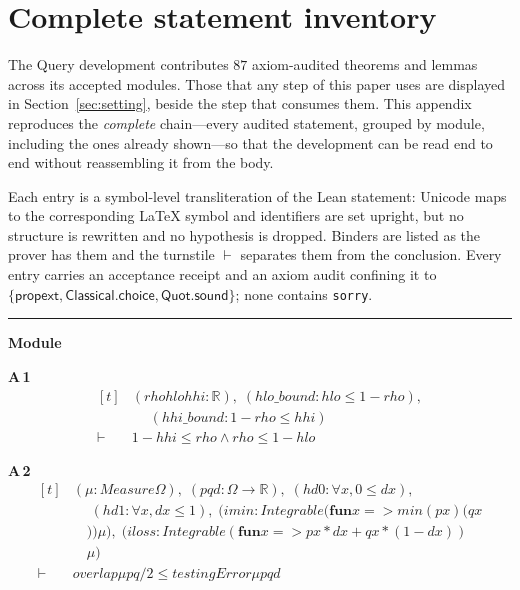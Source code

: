 \appendices
\section{Complete statement inventory}
\label{app:inventory}

The Query development contributes $87$ axiom-audited theorems and lemmas across its accepted modules. Those that any step of this paper uses are displayed in Section~\ref{sec:setting}, beside the step that consumes them. This appendix reproduces the \emph{complete} chain---every audited statement, grouped by module, including the ones already shown---so that the development can be read end to end without reassembling it from the body.

Each entry is a symbol-level transliteration of the Lean statement: Unicode maps to the corresponding \LaTeX{} symbol and identifiers are set upright, but no structure is rewritten and no hypothesis is dropped. Binders are listed as the prover has them and the turnstile $\vdash$ separates them from the conclusion. Every entry carries an acceptance receipt and an axiom audit confining it to $\{\textsf{propext},\textsf{Classical.choice},\textsf{Quot.sound}\}$; none contains \texttt{sorry}.

\vspace{4pt}\noindent\rule{\columnwidth}{0.4pt}\par\vspace{2pt}
\noindent\textbf{Module }\par\vspace{3pt}

\noindent\textbf{A\,1}\quad{}
{\footnotesize\[ \begin{aligned}[t]
&(\mathit{rho} \mathit{hlo} \mathit{hhi} : \mathbb{R} ),\; (\mathit{hlo\_bound} : \mathit{hlo} \leq 1-\mathit{rho}),\\
&\quad \; (\mathit{hhi\_bound} : 1-\mathit{rho} \leq \mathit{hhi})\\
\vdash\;&1-\mathit{hhi} \leq \mathit{rho} \wedge \mathit{rho} \leq 1-\mathit{hlo}
\end{aligned} \]}

\noindent\textbf{A\,2}\quad{}
{\footnotesize\[ \begin{aligned}[t]
&(\mu : \mathit{Measure} \Omega ),\; (\mathit{p} \mathit{q} \mathit{d} : \Omega \to \mathbb{R} ),\; (\mathit{hd0} : \forall \mathit{x}, 0 \leq \mathit{d} \mathit{x}),\\
&\quad \; (\mathit{hd1} : \forall \mathit{x}, \mathit{d} \mathit{x} \leq 1),\; (\mathit{imin} : \mathit{Integrable} (\mathbf{fun} \mathit{x} => \mathit{min} (\mathit{p} \mathit{x}) (\mathit{q} \mathit{x}\\
&\quad )) \mu ),\; (\mathit{iloss} : \mathit{Integrable} (\mathbf{fun} \mathit{x} => \mathit{p} \mathit{x}*\mathit{d} \mathit{x}+\mathit{q} \mathit{x}*(1-\mathit{d} \mathit{x}))\\
&\quad \mu )\\
\vdash\;&\mathit{overlap} \mu \mathit{p} \mathit{q}/2 \leq \mathit{testingError} \mu \mathit{p} \mathit{q} \mathit{d}
\end{aligned} \]}

